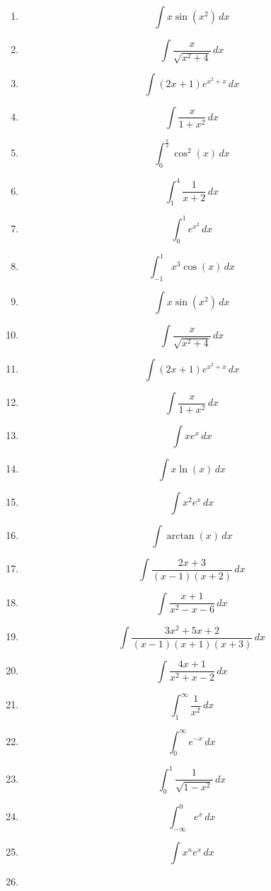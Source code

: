\documentclass[12pt]{extarticle}
\begin{document}
\begin{enumerate}
    \item
    \[
    \int x \sin(x^2) \, dx
    \]
    \item
    \[
    \int \frac{x}{\sqrt{x^2 + 4}} \, dx
    \]
    \item
    \[
    \int (2x + 1) e^{x^2 + x} \, dx
    \]
    \item
    \[
    \int \frac{x}{1 + x^2} \, dx
    \]
    \item
    \[
    \int_{0}^{\frac{\pi}{2}} \cos^2(x) \, dx
    \]
    \item
    \[
    \int_{1}^{4} \frac{1}{x + 2} \, dx
    \]
    \item
    \[
    \int_{0}^{1} e^{x^2} \, dx
    \]
    \item
    \[
    \int_{-1}^{1} x^3 \cos(x) \, dx
    \]
    \item
    \[
    \int x \sin(x^2) \, dx
    \]
    \item
    \[
    \int \frac{x}{\sqrt{x^2 + 4}} \, dx
    \]
    \item
    \[
    \int (2x + 1) e^{x^2 + x} \, dx
    \]
    \item
    \[
    \int \frac{x}{1 + x^2} \, dx
    \]
    \item
    \[
    \int x e^x \, dx
    \]
    \item
    \[
    \int x \ln(x) \, dx
    \]
    \item
    \[
    \int x^2 e^x \, dx
    \]
    \item
    \[
    \int \arctan(x) \, dx
    \]
    \item
    \[
    \int \frac{2x + 3}{(x - 1)(x + 2)} \, dx
    \]
    \item
    \[
    \int \frac{x + 1}{x^2 - x - 6} \, dx
    \]
    \item
    \[
    \int \frac{3x^2 + 5x + 2}{(x - 1)(x + 1)(x + 3)} \, dx
    \]
    \item
    \[
    \int \frac{4x + 1}{x^2 + x - 2} \, dx
    \]
    \item
    \[
    \int_{1}^{\infty} \frac{1}{x^2} \, dx
    \]
    \item
    \[
    \int_{0}^{\infty} e^{-x} \, dx
    \]
    \item
    \[
    \int_{0}^{1} \frac{1}{\sqrt{1 - x^2}} \, dx
    \]
    \item
    \[
    \int_{-\infty}^{0} e^{x} \, dx
    \]
    \item
    \[
    \int x^n e^x \, dx
    \]
    \item
    \[
\]
\end{enumerate}
\end{document}
